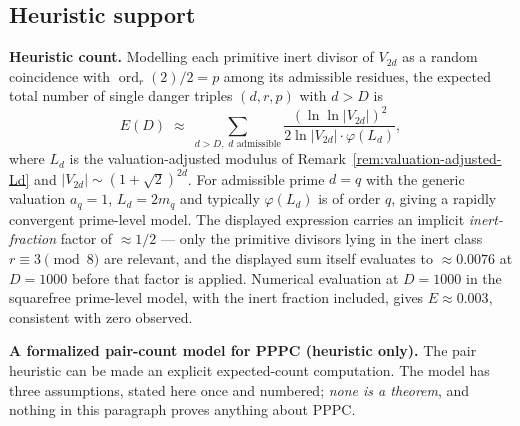 \documentclass[11pt]{amsart}
\theoremstyle{plain}
\theoremstyle{definition}
\theoremstyle{remark}
\numberwithin{equation}{section}
\newcommand{\ord}{\operatorname{ord}}
\begin{document}
\subsection{Heuristic support}\label{sec:heuristic}

\textbf{Heuristic count.} Modelling each primitive inert divisor of $V_{2 d}$ as a random coincidence with $\ord_r(2)/2 = p$ among its admissible residues, the expected total number of single danger triples $(d, r, p)$ with $d > D$ is
\[
  E(D) \;\approx\; \sum_{d > D,\; d \text{ admissible}} \frac{(\ln \ln |V_{2 d}|)^2}{2 \ln |V_{2 d}| \cdot \varphi(L_d)},
\]
where $L_d$ is the valuation-adjusted modulus of Remark~\ref{rem:valuation-adjusted-Ld} and $|V_{2 d}| \sim (1 + \sqrt 2)^{2 d}$. For admissible prime $d = q$ with the generic valuation $a_q=1$, $L_d = 2m_q$ and typically $\varphi(L_d)$ is of order $q$, giving a rapidly convergent prime-level model. The displayed expression carries an implicit \emph{inert-fraction} factor of $\approx 1/2$ --- only the primitive divisors lying in the inert class $r \equiv 3 \pmod 8$ are relevant, and the displayed sum itself evaluates to $\approx 0.0076$ at $D = 1000$ before that factor is applied. Numerical evaluation at $D = 1000$ in the squarefree prime-level model, with the inert fraction included, gives $E \approx 0.003$, consistent with zero observed.

\textbf{A formalized pair-count model for PPPC (heuristic only).} The
pair heuristic can be made an explicit expected-count computation. The
model has three assumptions, stated here once and numbered; \emph{none is
a theorem}, and nothing in this paragraph proves anything about PPPC.
\end{document}
